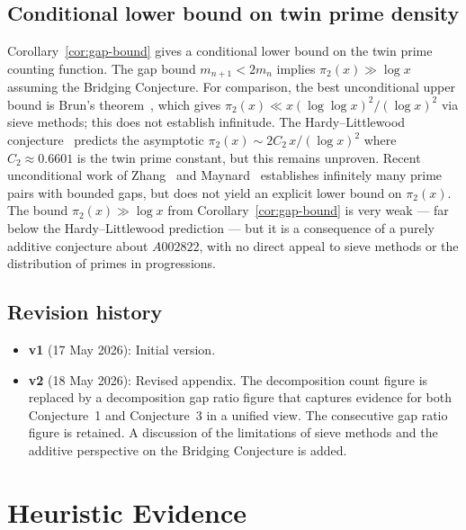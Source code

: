 \documentclass[12pt]{amsart}
\theoremstyle{definition}
\begin{document}
\subsection*{Conditional lower bound on twin prime density}

Corollary~\ref{cor:gap-bound} gives a conditional lower bound on the twin prime counting
function. The gap bound $m_{n+1} < 2m_n$ implies $\pi_2(x) \gg \log x$ assuming the
Bridging Conjecture. For comparison, the best unconditional upper bound is Brun's
theorem~\cite{brun1919}, which gives $\pi_2(x) \ll x(\log\log x)^2/(\log x)^2$ via
sieve methods; this does not establish infinitude. The Hardy--Littlewood
conjecture~\cite{hardylittlewood1923} predicts the asymptotic
$\pi_2(x) \sim 2C_2\, x/(\log x)^2$ where $C_2 \approx 0.6601$ is the twin prime
constant, but this remains unproven. Recent unconditional work of Zhang~\cite{zhang2014}
and Maynard~\cite{maynard2015} establishes infinitely many prime pairs with bounded gaps,
but does not yield an explicit lower bound on $\pi_2(x)$. The bound $\pi_2(x) \gg \log x$
from Corollary~\ref{cor:gap-bound} is very weak — far below the Hardy--Littlewood
prediction — but it is a consequence of a purely additive conjecture about $A002822$,
with no direct appeal to sieve methods or the distribution of primes in progressions.

\subsection*{Revision history}

\begin{itemize}
  \item \textbf{v1} (17 May 2026): Initial version.
  \item \textbf{v2} (18 May 2026): Revised appendix. The decomposition count figure
    is replaced by a decomposition gap ratio figure that captures evidence for both
    Conjecture~1 and Conjecture~3 in a unified view. The consecutive gap ratio figure
    is retained. A discussion of the limitations of sieve methods and the additive
    perspective on the Bridging Conjecture is added.
\end{itemize}

\appendix
\section{Heuristic Evidence}
\label{sec:heuristics}
\end{document}
